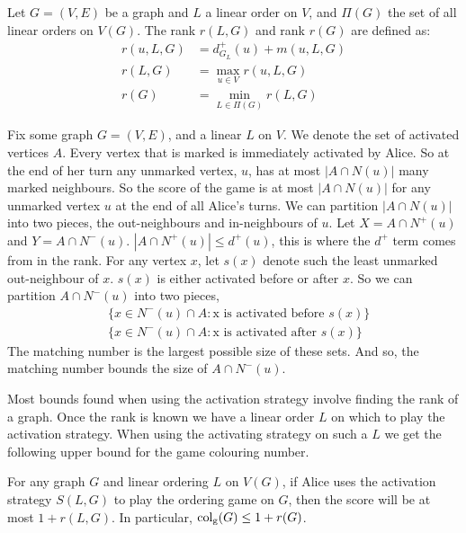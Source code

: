 \begin{definition} \label{defnRank}
    Let $G=(V,E)$ be a graph and $L$ a linear order on $V$, and $\Pi(G)$ the set of all linear orders on $V(G)$. The rank $r(L,G)$ and rank $r(G)$ are defined as:
    \begin{align*}
    r(u,L,G) & = d^+_{G_L}(u) + m(u,L,G) \\
    r(L,G)   & = \max_{u \in V}r(u,L,G)  \\
    r(G)     & = \min_{L \in \Pi(G)} r(L,G)
    \end{align*}
\end{definition}

Fix some graph $G=(V,E)$, and a linear $L$ on $V$. We denote the set of activated vertices $A$. Every vertex that is marked is immediately activated by Alice. So at the end of her turn any unmarked vertex, $u$, has at most $|A\cap N(u)|$ many marked neighbours. So the score of the game is at most $|A\cap N(u)|$ for any unmarked vertex $u$ at the end of all Alice's turns. We can partition $|A\cap N(u)|$ into two pieces, the out-neighbours and in-neighbours of $u$. Let $X= A\cap N^+(u)$ and $Y=A\cap N^-(u)$.  $|A\cap N^+(u)|\leq d^+(u)$, this is where the $d^+$ term comes from in the rank. For any vertex $x$, let $s(x)$ denote such the least unmarked out-neighbour of $x$. $s(x)$ is either activated before or after $x$. So we can partition $A\cap N^-(u)$ into two pieces,
\begin{align*}
&\{x\in N^-(u)\cap A : \text{x is activated before $s(x)$}\} \\        
&\{x\in N^-(u)\cap A : \text{x is activated after $s(x)$}\}
\end{align*}
The matching number is the largest possible size of these sets. And so, the matching number bounds the size of $A\cap N^-(u)$.

Most bounds found when using the activation strategy involve finding the rank of a graph. Once the rank is known we have a linear order $L$ on which to play the activation strategy. When using the activating strategy on such a $L$ we get the following upper bound for the game colouring number. 

\begin{theorem} \label{thm:KIERSTEAD1}
    For any graph $G$ and linear ordering $L$ on $V(G)$, if Alice uses the activation strategy $S(L, G)$ to play the ordering game on $G$, then the score will be at most $1+r(L, G)$. In particular, $\operatorname{col_g}(G) \leq 1+r(G)$.
\end{theorem}

